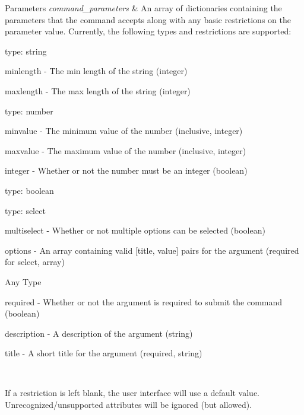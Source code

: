 \begin{DoxyParams}{Parameters}
{\em command\-\_\-parameters} & An array of dictionaries containing the parameters that the command accepts along with any basic restrictions on the parameter value. Currently, the following types and restrictions are supported\-:
\begin{DoxyItemize}
\item type\-: string
\begin{DoxyItemize}
\item minlength -\/ The min length of the string (integer)
\item maxlength -\/ The max length of the string (integer)
\end{DoxyItemize}
\item type\-: number
\begin{DoxyItemize}
\item minvalue -\/ The minimum value of the number (inclusive, integer)
\item maxvalue -\/ The maximum value of the number (inclusive, integer)
\item integer -\/ Whether or not the number must be an integer (boolean)
\end{DoxyItemize}
\item type\-: boolean
\item type\-: select
\begin{DoxyItemize}
\item multiselect -\/ Whether or not multiple options can be selected (boolean)
\item options -\/ An array containing valid \mbox{[}title, value\mbox{]} pairs for the argument (required for select, array)
\end{DoxyItemize}
\item Any Type
\begin{DoxyItemize}
\item required -\/ Whether or not the argument is required to submit the command (boolean)
\item description -\/ A description of the argument (string)
\item title -\/ A short title for the argument (required, string)
\end{DoxyItemize}
\end{DoxyItemize}\\
\hline
\end{DoxyParams}
If a restriction is left blank, the user interface will use a default value. Unrecognized/unsupported attributes will be ignored (but allowed). 
